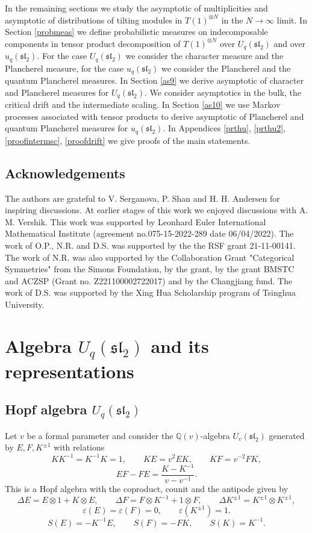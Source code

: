 \documentclass[11pt]{amsart}
\newcommand\lie[1]{\mathfrak{#1}}
\newcommand{\Q}{\mathbb{Q}}
\begin{document}
In the remaining sections we study the asymptotic of multiplicities and asymptotic of distributions of tilting modules in $T(1)^{\otimes N}$ in the $N\to\infty$ limit. In Section \ref{probmeas} we define probabilistic measures on indecomposable components in tensor product decomposition of $T(1)^{\otimes N}$ over $U_q(\mathfrak{sl}_2)$ and over $u_q(\mathfrak{sl}_2)$. For the case $U_q(\mathfrak{sl}_2)$ we consider the character measure and the Plancherel measure, for the case $u_q(\mathfrak{sl}_2)$ we consider the Plancherel and the quantum Plancherel measures. In Section \ref{as9} we derive asymptotic of character and Plancherel measures for $U_q(\mathfrak{sl}_2)$. We consider asymptotics in the bulk, the critical drift and the intermediate scaling. In Section \ref{as10} we use Markov processes associated with tensor products to derive asymptotic of Plancherel and quantum Plancherel measures for $u_q(\mathfrak{sl}_2)$. In Appendices \ref{prthu}, \ref{prthu2}, \ref{proofintermsc}, \ref{proofdrift} we give proofs of the main statements.


\subsection{Acknowledgements} The authors are grateful to V. Serganova, P. Shan and H. H. Andersen for inspiring discussions. At earlier stages of this work we enjoyed discussions with A. M. Vershik. This work was supported by Leonhard Euler International Mathematical Institute (agreement no.075-15-2022-289 date 06/04/2022). The work of O.P., N.R. and D.S. was supported by the the RSF grant 21-11-00141. The work of N.R. was also supported by the Collaboration Grant "Categorical Symmetries" from the Simons Foundation, by the grant, by the grant BMSTC and ACZSP (Grant no. Z221100002722017) and by the Changjiang fund. The work of D.S. was supported by the Xing Hua Scholarship program of Tsinghua University.


\section{Algebra $U_q(\lie{sl}_2)$ and its representations}\label{one}
\subsection{Hopf algebra $U_q(\lie{sl}_2)$}\label{qsl2}

Let $v$ be a formal parameter and consider the $\Q(v)$-algebra $U_v(\lie{sl}_2)$ generated by $E, F, K^{\pm1}$ with relations 
\[ K K^{-1} = K^{-1}K =1 , \quad \quad K E = v^2 E K , \quad \quad K F = v^{-2} F K , \] 
\[ EF - F E  = \frac{K - K^{-1}}{v - v^{-1}} .\] 
This is a Hopf algebra with the coproduct, counit and the antipode given by 
\[ \Delta E = E \otimes 1 + K \otimes E , \quad \quad \Delta F = F \otimes K^{-1} + 1 \otimes F, \quad \quad \Delta K^{\pm 1}  = K^{\pm 1} \otimes K^{\pm 1} ,\] 
\[ \varepsilon(E) = \varepsilon(F) = 0, \quad \quad \varepsilon(K^{\pm 1}) = 1  .\]   
\[ S(E) = -K^{-1} E, \quad \quad S(F) = -FK, \quad \quad S(K) = K^{-1} . \] 
\end{document}
